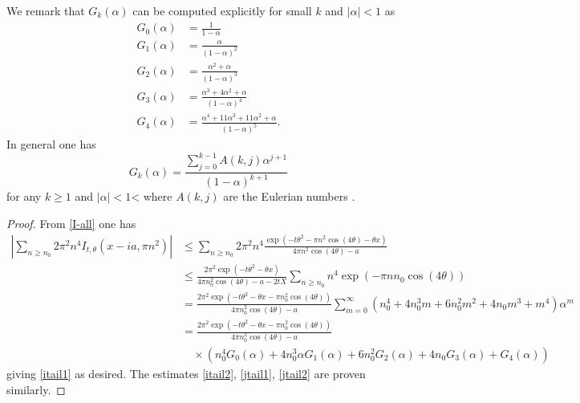We remark that $G_k(\alpha)$ can be computed explicitly for small $k$ and $|\alpha|<1$ as
\begin{align*}
G_0(\alpha) &= \frac{1}{1-\alpha} \\
G_1(\alpha) &= \frac{\alpha}{(1-\alpha)^2} \\
G_2(\alpha) &= \frac{\alpha^2+\alpha}{(1-\alpha)^3} \\
G_3(\alpha) &= \frac{\alpha^3+4\alpha^2+\alpha}{(1-\alpha)^4} \\
G_4(\alpha) &= \frac{\alpha^4+11\alpha^3+11\alpha^2+\alpha}{(1-\alpha)^5}.
\end{align*}
In general one has
$$ G_k(\alpha) = \frac{\sum_{j=0}^{k-1} A(k,j) \alpha^{j+1}}{(1-\alpha)^{k+1}}$$
for any $k \geq 1$ and $|\alpha|<1$< where $A(k,j)$ are the Eulerian numbers \cite{euler}.

\begin{proof}  From \eqref{I-all} one has
\begin{align*}
 |\sum_{n \geq n_0} 2\pi^2 n^4 I_{t,\theta}(x-ia, \pi n^2)|
&\leq \sum_{n \geq n_0} 2\pi^2 n^4 \frac{\exp( -t \theta^2 - \pi n^2 \cos(4\theta) - \theta x )}{4 \pi n^2 \cos(4\theta) - a} \\
&\leq \frac{2\pi^2 \exp(-t \theta^2 - \theta x)}{4\pi n_0^2 \cos(4\theta) - a- 2tX} \sum_{n \geq n_0} n^4 \exp( - \pi n n_0 \cos(4\theta)) \\ 
&= \frac{2\pi^2 \exp(-t \theta^2 - \theta x - \pi n_0^2 \cos(4\theta))}{4\pi n_0^2 \cos(4\theta) - a} \sum_{m=0}^\infty (n_0^4 + 4 n_0^3 m + 6 n_0^2 m^2 + 4 n_0 m^3 + m^4) \alpha^m \\
&= \frac{2\pi^2 \exp(-t \theta^2 - \theta x - \pi n_0^2 \cos(4\theta))}{4\pi n_0^2 \cos(4\theta) - a} \\
&\quad  \times \left( n_0^4 G_0(\alpha) + 
4 n_0^3 \alpha G_1(\alpha) + 6 n_0^2 G_2(\alpha) + 4n_0 G_3(\alpha) + G_4(\alpha) \right) 
\end{align*}
giving \eqref{itail1} as desired.  The estimates \eqref{itail2}, \eqref{jtail1}, \eqref{jtail2} are proven similarly.
\end{proof}